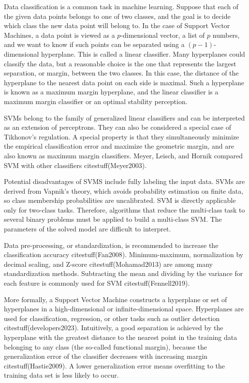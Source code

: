 \documentclass[preprint,12pt]{elsarticle}
\begin{document}
Data classification is a common task in machine learning. Suppose that each of the given data points belongs to one of two classes, and the goal is to decide which class the new data point will belong to. In the case of Support Vector Machines, a data point is viewed as a $p$-dimensional vector, a list of $p$ numbers, and we want to know if such points can be separated using a $(p-1)$-dimensional hyperplane. This is called a linear classifier. Many hyperplanes could classify the data, but a reasonable choice is the one that represents the largest separation, or margin, between the two classes. In this case, the distance of the hyperplane to the nearest data point on each side is maximal. Such a hyperplane is known as a maximum margin hyperplane, and the linear classifier is a maximum margin classifier or an optimal stability perception.

SVMs belong to the family of generalized linear classifiers and can be interpreted as an extension of perceptrons. They can also be considered a special case of Tikhonov's regulation. A special property is that they simultaneously minimize the empirical classification error and maximize the geometric margin, and are also known as maximum margin classifiers. Meyer, Leisch, and Hornik compared SVM with other classifiers citestuff(Meyer2003).

Potential disadvantages of SVMS include fully labeling the input data. SVMs are derived from Vapnik's theory, which avoids probability estimation on finite data, so class membership probabilities are uncalibrated. SVM is directly applicable only for two-class tasks. Therefore, algorithms that reduce the multi-class task to several binary problems must be applied to build a multi-class SVM. The parameters of the solved model are difficult to interpret.

Data pre-processing, or standardization, is recommended to increase the classification accuracy citestuff(Fan2008). Minimum-maximum, normalization by decimal scaling, and Z-score citestuff(Mohamad2013) are among many standardization methods. Subtracting the mean and dividing by the variance for each feature is commonly used for SVM citestuff(Fennell2019).

More formally, a Support Vector Machine constructs a hyperplane or set of hyperplanes in a high-dimensional or infinite-dimensional space. Hyperplanes are used for classification, regression, or other tasks such as outlier detection citestuff(developers2023). Intuitively, a good separation is achieved by the hyperplane with the greatest distance to the nearest point in the training data belonging to any class (the so-called functional margin), because the generalization error of the classifier decreases with increasing margin citestuff(Hastie2009). A lower generalization error means overfitting to the training data set is less likely to occur.
\end{document}

